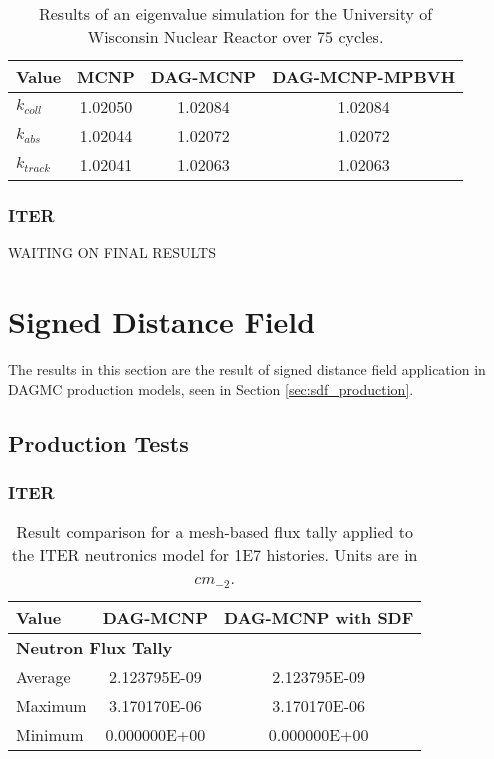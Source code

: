   
  \begin{table}
    \small
    \begin{center}
      \begin{tabular}{lccc}
        \toprule
        Value     & MCNP    & DAG-MCNP & DAG-MCNP-MPBVH \\
        \toprule
        $k_{coll}$  & 1.02050 & 1.02084  & 1.02084        \\
        $k_{abs}$   & 1.02044 & 1.02072  & 1.02072        \\
        $k_{track}$ & 1.02041 & 1.02063  & 1.02063        \\
        \bottomrule
      \end{tabular}
    \end{center}
    \caption[Results of eigenvalue simulations in UWNR for various DAG-MCNP
      implementations.]{Results of an eigenvalue simulation for the University
      of Wisconsin Nuclear Reactor over 75 cycles.}
  \end{table}


  \subsubsection{ITER}
  WAITING ON FINAL RESULTS

  \section{Signed Distance Field}

  The results in this section are the result of signed distance field
  application in DAGMC production models, seen in Section
  \ref{sec:sdf_production}. 
  
\subsection{Production Tests}

\subsubsection{ITER}

\begin{table}
  \small
  \begin{center}
    \begin{tabular}{lcc}
          \toprule
          Value   & DAG-MCNP     & DAG-MCNP with SDF      \\
          \toprule
          \multicolumn{3}{l}{\textbf{Neutron Flux Tally}} \\
          Average & 2.123795E-09 & 2.123795E-09           \\
          Maximum & 3.170170E-06 & 3.170170E-06           \\
          Minimum & 0.000000E+00 & 0.000000E+00           \\
          \bottomrule
    \end{tabular}
  \end{center}
  \caption[Flux tally results in the ITER model for various DAG-MCNP
    implementations.]{Result comparison for a mesh-based flux tally applied to
    the ITER neutronics model for \num{1E7} histories. Units are in $cm_{-2}$.}
\end{table}


